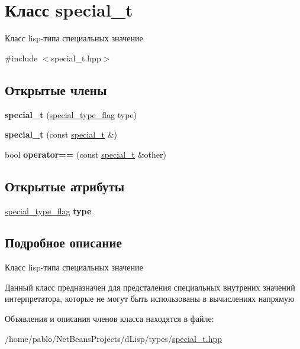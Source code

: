 \hypertarget{classspecial__t}{}\section{Класс special\+\_\+t}
\label{classspecial__t}


Класс lisp-\/типа специальных значение  




{\ttfamily \#include $<$special\+\_\+t.\+hpp$>$}

\subsection*{Открытые члены}
\begin{DoxyCompactItemize}
\item 
\mbox{\label{classspecial__t_aac3a593193f0196940190c54e9f6aa5c}} 
{\bfseries special\+\_\+t} (\mbox{\hyperlink{special__t_8hpp_af80c2ea5ebf91ef19f47fd2e190d7149}{special\+\_\+type\+\_\+flag}} type)
\item 
\mbox{\label{classspecial__t_a42699488788fe74b3a0ca3969b6ba45a}} 
{\bfseries special\+\_\+t} (const \mbox{\hyperlink{classspecial__t}{special\+\_\+t}} \&)
\item 
\mbox{\label{classspecial__t_aad7430141412a11b5c40a61abd9297ab}} 
bool {\bfseries operator==} (const \mbox{\hyperlink{classspecial__t}{special\+\_\+t}} \&other)
\end{DoxyCompactItemize}
\subsection*{Открытые атрибуты}
\begin{DoxyCompactItemize}
\item 
\mbox{\label{classspecial__t_ae86baa19a7cb7796ee6cdd24c76836ac}} 
\mbox{\hyperlink{special__t_8hpp_af80c2ea5ebf91ef19f47fd2e190d7149}{special\+\_\+type\+\_\+flag}} {\bfseries type}
\end{DoxyCompactItemize}


\subsection{Подробное описание}
Класс lisp-\/типа специальных значение 

Данный класс предназначен для предсталения специальных внутрених значений интерпретатора, которые не могут быть использованы в вычислениях напрямую 

Объявления и описания членов класса находятся в файле\+:\begin{DoxyCompactItemize}
\item 
/home/pablo/\+Net\+Beans\+Projects/d\+Lisp/types/\mbox{\hyperlink{special__t_8hpp}{special\+\_\+t.\+hpp}}\end{DoxyCompactItemize}
